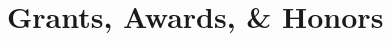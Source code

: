 \documentclass[letterpaper]{article}
\newenvironment{publist}{%
  \begin{list}{}{%
    \setlength{\leftmargin}{0cm}   %
    \setlength{\labelwidth}{2cm}     %
    \setlength{\labelsep}{0.5cm}     %
  }%
}{%
  \end{list}%
}
\begin{document}
\begin{publist}



\end{publist}

\section*{\textbf{Grants, Awards, \& Honors}}
\end{document}
